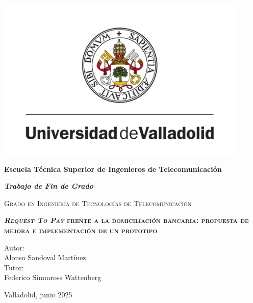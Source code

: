 \documentclass{article}
\begin{document}

\begin{titlepage}
    \centering
    {\includegraphics[width=0.9\textwidth]{Imagenes/Universidad-de-Valladolid.png}}\par
    {\bfseries\Large Escuela Técnica Superior de Ingenieros de Telecomunicación\par}
    \vspace{0.5cm}
    {\bfseries\itshape\Large Trabajo de Fin de Grado \par}
    \vspace{0.5cm}
    {\scshape Grado en Ingeniería de Tecnologías de Telecomunicación \par}
    \vspace{0.5cm}
    {\bfseries\scshape\Large \textit{Request To Pay} frente a la domiciliación bancaria: propuesta de mejora e implementación de un prototipo \par}
    \vspace{1.5cm}
    { Autor: \\}
    { Alonso Sandoval Martínez }\\
    \vspace{0.5cm}
    { Tutor:\\}
    { Federico Simmross Wattenberg }\\
    \vspace{1.5cm} {Valladolid, junio 2025 \par}
\end{titlepage}


\newpage

\end{document}
